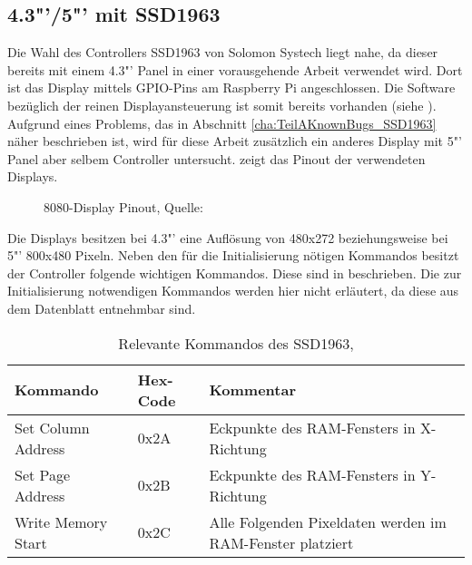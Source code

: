 \subsection{4.3"'/5"' mit SSD1963}
Die Wahl des Controllers SSD1963 von Solomon Systech liegt nahe, da dieser bereits mit einem 4.3"'  Panel in einer vorausgehende Arbeit verwendet wird. Dort ist das Display mittels GPIO-Pins am Raspberry Pi angeschlossen. Die Software bezüglich der reinen Displayansteuerung ist somit bereits vorhanden (siehe \cite{Schlegel2013a}). Aufgrund eines Problems, das in Abschnitt \ref{cha:TeilAKnownBugs_SSD1963} näher beschrieben ist, wird für diese Arbeit zusätzlich ein anderes Display mit 5"' Panel aber selbem Controller untersucht. 
 zeigt das Pinout der verwendeten Displays.
\begin{figure}[h]
	\centering
{}
	\caption{8080-Display Pinout, Quelle: \cite{Coldtears2014}}
	\label{fig:8080_pinout}
\end{figure}
Die Displays besitzen bei 4.3"' eine Auflösung von 480x272 beziehungsweise bei 5"' 800x480 Pixeln. Neben den für die Initialisierung nötigen Kommandos besitzt der Controller folgende wichtigen Kommandos. Diese sind in  beschrieben. Die zur Initialisierung notwendigen Kommandos werden hier nicht erläutert, da diese aus dem Datenblatt entnehmbar sind.
\begin{table}[h]
\begin{tabular}{|p{4cm}|p{1cm}|p{8cm}|}\hline
\rowcolor{TableBackgroundColor} 
   \textbf{Kommando} & \textbf{Hex-Code} & \textbf{Kommentar}\\ \hline
   Set Column Address & 0x2A & Eckpunkte des RAM-Fensters in X-Richtung \\ \hline
   Set Page Address & 0x2B & Eckpunkte des RAM-Fensters in Y-Richtung \\ \hline
   Write Memory Start & 0x2C & Alle Folgenden Pixeldaten werden im RAM-Fenster platziert \\ \hline
\end{tabular}
\caption{Relevante Kommandos des SSD1963, \cite{SSD2008}}
\label{tab:Kommandos_SSD1963}
\end{table}



